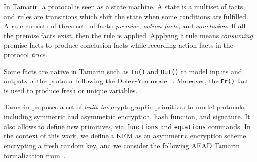 
In Tamarin, a protocol is seen as a state machine. A state is a multiset of facts, and rules are transitions which shift the state when some conditions are fulfilled.
%
A rule consists of three sets of facts: \emph{premise}, \emph{action facts}, and \emph{conclusion}. If all the premise facts exist, then the rule is applied. Applying a rule means \emph{consuming} premise facts to produce conclusion facts while recording action facts in the protocol \emph{trace}.



Some facts are native in Tamarin such as \texttt{In()} and \texttt{Out()} to model inputs and outputs of the protocol following the Dolev-Yao model~\cite{DolevY83}. Moreover, the \texttt{Fr()} fact is used to produce fresh or unique variables.

Tamarin proposes a set of \emph{built-ins} cryptographic primitives to model protocols, including sy\-mme\-tric and asymmetric encryption, hash function, and signature. It also allows to define new primitives, via \texttt{functions} and \texttt{equations} commands. In the context of this work, we define a KEM as an asymmetric encryption scheme encrypting a fresh random key, and we consider the following AEAD Tamarin formalization from~\cite{SP:HNSWZ21}.


